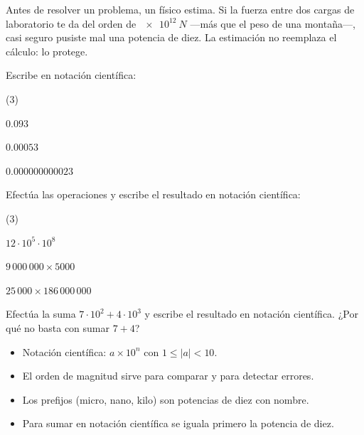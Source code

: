 \documentclass[11pt]{article}
\begin{document}
\begin{aplicacion}
Antes de resolver un problema, un físico estima. Si la fuerza entre dos cargas
de laboratorio te da del orden de $\qty{e12}{N}$ ---más que el peso de una
montaña---, casi seguro pusiste mal una potencia de diez. La estimación no
reemplaza el cálculo: lo protege.
\end{aplicacion}

\begin{preguntas}
\pregunta Escribe en notación científica:
\begin{opciones*}(3)
  \item $\num{0,093}$
  \item $\num{0,00053}$
  \item $\num{0,000000000023}$
\end{opciones*}
\espacio{2cm}
\pregunta Efectúa las operaciones y escribe el resultado en notación científica:
\begin{opciones*}(3)
  \item $12 \cdot 10^{5} \cdot 10^{8}$
  \item $9\,000\,000 \times 5000$
  \item $25\,000 \times 186\,000\,000$
\end{opciones*}
\espacio{2.5cm}
\pregunta Efectúa la suma $7 \cdot 10^{2} + 4 \cdot 10^{3}$ y escribe el
resultado en notación científica. ¿Por qué no basta con sumar $7 + 4$?
\espacio{2.5cm}
\end{preguntas}

\begin{resumen}
\begin{itemize}
  \item Notación científica: $a \times 10^{n}$ con $1 \le |a| < 10$.
  \item El orden de magnitud sirve para comparar y para detectar errores.
  \item Los prefijos (micro, nano, kilo) son potencias de diez con nombre.
  \item Para sumar en notación científica se iguala primero la potencia de diez.
\end{itemize}
\end{resumen}

\label{tema:carga}
\end{document}
